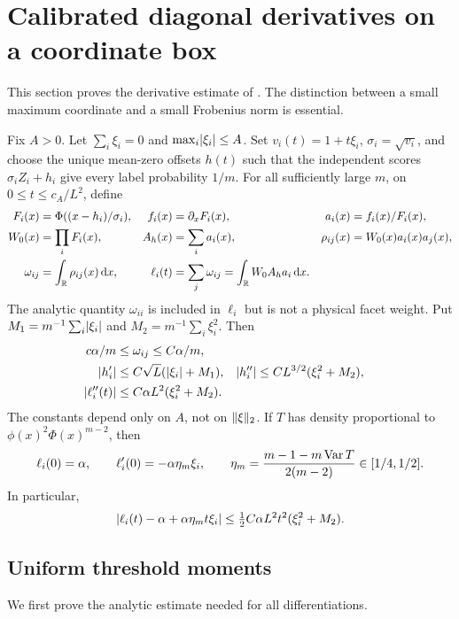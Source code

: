 \section{Calibrated diagonal derivatives on a coordinate box}
\label{sec:calibration}
This section proves the derivative estimate of \cite{hazards}.
The distinction between a small maximum coordinate and a small
Frobenius norm is essential.

\begin{proposition}\label{prop:hazard}
Fix $A>0$. Let $\sum_i\xi_i=0$ and $\max_i\lvert \xi_i\rvert\le A$.
Set $v_i(t)=1+t\xi_i$, $\sigma_i=\sqrt{v_i}$, and choose the unique
mean-zero offsets $h(t)$ such that the independent scores
$\sigma_iZ_i+h_i$ give every label probability $1/m$.
For all sufficiently large $m$, on $0\le t\le c_A/L^2$, define
\begin{align*}
 F_i(x)&=\Phi((x-h_i)/\sigma_i),& f_i(x)&=\partial_xF_i(x),&
 a_i(x)&=f_i(x)/F_i(x),\\
 W_0(x)&=\prod_iF_i(x),& A_h(x)&=\sum_i a_i(x),&
 \rho_{ij}(x)&=W_0(x)a_i(x)a_j(x),\\
 \omega_{ij}&=\int_\mathbb R\rho_{ij}(x)\,\mathrm d x,&
 \ell_i(t)&=\sum_j\omega_{ij}=\int_\mathbb R W_0 A_h a_i\,\mathrm d x.
\end{align*}
The analytic quantity $\omega_{ii}$ is included in $\ell_i$ but is not
a physical facet weight. Put $M_1=m^{-1}\sum_i\lvert \xi_i\rvert$ and
$M_2=m^{-1}\sum_i\xi_i^2$. Then
\begin{align}
 c\alpha/m&\le\omega_{ij}\le C\alpha/m,\label{eq:weightbox}\\
 \lvert h_i'\rvert&\le C\sqrt L(\lvert \xi_i\rvert+M_1),&
 \lvert h_i''\rvert&\le CL^{3/2}(\xi_i^2+M_2),\label{eq:offsetderivatives}\\
 \lvert \ell_i''(t)\rvert&\le C\alpha L^2(\xi_i^2+M_2).
 \label{eq:ell-second}
\end{align}
The constants depend only on $A$, not on $\lVert \xi\rVert_2$.
If $T$ has density proportional to $\phi(x)^2\Phi(x)^{m-2}$, then
\begin{equation}\label{eq:ell-exact}
 \ell_i(0)=\alpha,\qquad
 \ell_i'(0)=-\alpha\eta_m\xi_i,\qquad
 \eta_m=\frac{m-1-m\operatorname{Var} T}{2(m-2)}\in[1/4,1/2].
\end{equation}
In particular,
\begin{equation}\label{eq:ell-Taylor}
 \lvert \ell_i(t)-\alpha+\alpha\eta_m t\xi_i\rvert
       \le \tfrac12 C\alpha L^2t^2(\xi_i^2+M_2).
\end{equation}
\end{proposition}

\subsection{Uniform threshold moments}
We first prove the analytic estimate needed for all differentiations.

